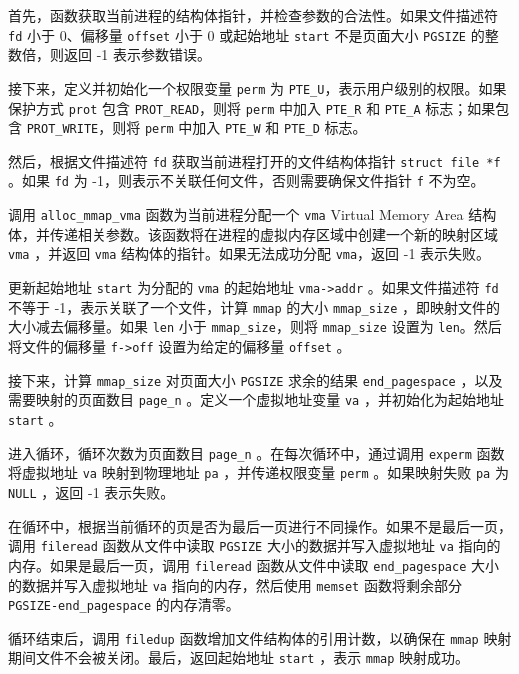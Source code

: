 \documentclass[UTF8]{article}
\begin{document}
\begin{enumerate}
        首先，函数获取当前进程的结构体指针，并检查参数的合法性。如果文件描述符 \texttt{fd} 小于 0、偏移量 \texttt{offset} 小于 0 或起始地址 \texttt{start} 不是页面大小 \texttt{PGSIZE} 的整数倍，则返回 -1 表示参数错误。

        接下来，定义并初始化一个权限变量 \texttt{perm} 为 \texttt{PTE\_U}，表示用户级别的权限。如果保护方式 \texttt{prot} 包含 \texttt{PROT\_READ}，则将 \texttt{perm} 中加入 \texttt{PTE\_R} 和 \texttt{PTE\_A} 标志；如果包含 \texttt{PROT\_WRITE}，则将 \texttt{perm} 中加入 \texttt{PTE\_W} 和 \texttt{PTE\_D} 标志。

        然后，根据文件描述符 \texttt{fd} 获取当前进程打开的文件结构体指针 \texttt{struct file *f} 。如果 \texttt{fd} 为 -1，则表示不关联任何文件，否则需要确保文件指针 \texttt{f} 不为空。

        调用 \texttt{alloc\_mmap\_vma} 函数为当前进程分配一个 \texttt{vma} Virtual Memory Area 结构体，并传递相关参数。该函数将在进程的虚拟内存区域中创建一个新的映射区域 \texttt{vma} ，并返回 \texttt{vma} 结构体的指针。如果无法成功分配 \texttt{vma}，返回 -1 表示失败。

        更新起始地址 \texttt{start} 为分配的 \texttt{vma} 的起始地址 \texttt{vma->addr} 。如果文件描述符 \texttt{fd} 不等于 -1，表示关联了一个文件，计算 \texttt{mmap} 的大小 \texttt{mmap\_size} ，即映射文件的大小减去偏移量。如果 \texttt{len} 小于 \texttt{mmap\_size}，则将 \texttt{mmap\_size} 设置为 \texttt{len}。然后将文件的偏移量 \texttt{f->off} 设置为给定的偏移量 \texttt{offset} 。

        接下来，计算 \texttt{mmap\_size} 对页面大小 \texttt{PGSIZE} 求余的结果 \texttt{end\_pagespace} ，以及需要映射的页面数目 \texttt{page\_n} 。定义一个虚拟地址变量 \texttt{va} ，并初始化为起始地址 \texttt{start} 。

        进入循环，循环次数为页面数目 \texttt{page\_n} 。在每次循环中，通过调用 \texttt{experm} 函数将虚拟地址 \texttt{va} 映射到物理地址 \texttt{pa} ，并传递权限变量 \texttt{perm} 。如果映射失败 \texttt{pa} 为 \texttt{NULL} ，返回 -1 表示失败。

        在循环中，根据当前循环的页是否为最后一页进行不同操作。如果不是最后一页，调用 \texttt{fileread} 函数从文件中读取 \texttt{PGSIZE} 大小的数据并写入虚拟地址 \texttt{va} 指向的内存。如果是最后一页，调用 \texttt{fileread} 函数从文件中读取 \texttt{end\_pagespace} 大小的数据并写入虚拟地址 \texttt{va} 指向的内存，然后使用 \texttt{memset} 函数将剩余部分 \texttt{PGSIZE-end\_pagespace} 的内存清零。

        循环结束后，调用 \texttt{filedup} 函数增加文件结构体的引用计数，以确保在 \texttt{mmap} 映射期间文件不会被关闭。最后，返回起始地址 \texttt{start} ，表示 \texttt{mmap} 映射成功。


\end{enumerate}
\end{document}
